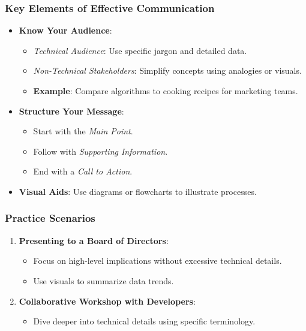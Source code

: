 \documentclass[aspectratio=169]{beamer}
\begin{document}
\begin{frame}[fragile]
    \frametitle{Key Elements of Effective Communication}
    \begin{itemize}
        \item \textbf{Know Your Audience}:
            \begin{itemize}
                \item \textit{Technical Audience}: Use specific jargon and detailed data.
                \item \textit{Non-Technical Stakeholders}: Simplify concepts using analogies or visuals.
                \item \textbf{Example}: Compare algorithms to cooking recipes for marketing teams.
            \end{itemize}
        
        \item \textbf{Structure Your Message}:
            \begin{itemize}
                \item Start with the \textit{Main Point}.
                \item Follow with \textit{Supporting Information}.
                \item End with a \textit{Call to Action}.
            \end{itemize}

        \item \textbf{Visual Aids}: Use diagrams or flowcharts to illustrate processes.
    \end{itemize}
\end{frame}

\begin{frame}[fragile]
    \frametitle{Practice Scenarios}
    \begin{enumerate}
        \item \textbf{Presenting to a Board of Directors}:
            \begin{itemize}
                \item Focus on high-level implications without excessive technical details. 
                \item Use visuals to summarize data trends.
            \end{itemize}

        \item \textbf{Collaborative Workshop with Developers}:
            \begin{itemize}
                \item Dive deeper into technical details using specific terminology.
            \end{itemize}
    \end{enumerate}
\end{frame}
\end{document}
